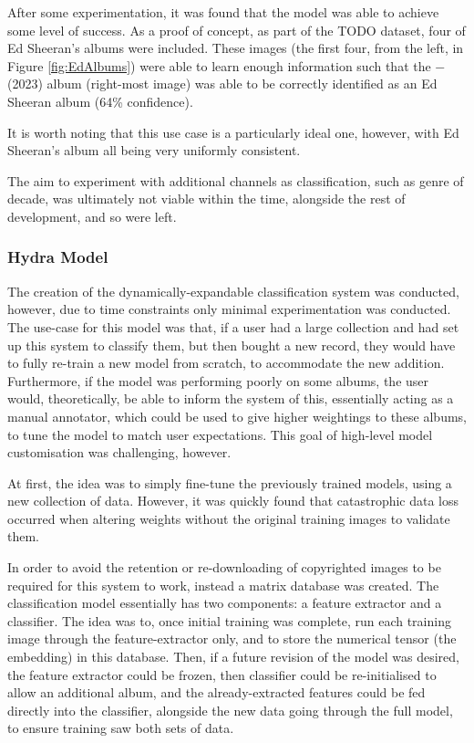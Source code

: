                 After some experimentation, it was found that the model was able to achieve some level of success. As a proof of concept, as part of the TODO dataset, four of Ed Sheeran's albums were included. These images (the first four, from the left, in Figure \ref{fig:EdAlbums}) were able to learn enough information such that the − (2023) album (right-most image) was able to be correctly identified as an Ed Sheeran album (64\% confidence).
    
                It is worth noting that this use case is a particularly ideal one, however, with Ed Sheeran's album all being very uniformly consistent.
    
                The aim to experiment with additional channels as classification, such as genre of decade, was ultimately not viable within the time, alongside the rest of development, and so were left.
                
    
            \subsubsection{Hydra Model}
    
                The creation of the dynamically-expandable classification system was conducted, however, due to time constraints only minimal experimentation was conducted. The use-case for this model was that, if a user had a large collection and had set up this system to classify them, but then bought a new record, they would have to fully re-train a new model from scratch, to accommodate the new addition. Furthermore, if the model was performing poorly on some albums, the user would, theoretically, be able to inform the system of this, essentially acting as a manual annotator, which could be used to give higher weightings to these albums, to tune the model to match user expectations. This goal of high-level model customisation was challenging, however.
    
                At first, the idea was to simply fine-tune the previously trained models, using a new collection of data. However, it was quickly found that catastrophic data loss occurred when altering weights without the original training images to validate them.
    
                In order to avoid the retention or re-downloading of copyrighted images to be required for this system to work, instead a matrix database was created. The classification model essentially has two components: a feature extractor and a classifier. The idea was to, once initial training was complete, run each training image through the feature-extractor only, and to store the numerical tensor (the embedding) in this database. Then, if a future revision of the model was desired, the feature extractor could be frozen, then classifier could be re-initialised to allow an additional album, and the already-extracted features could be fed directly into the classifier, alongside the new data going through the full model, to ensure training saw both sets of data.
    
